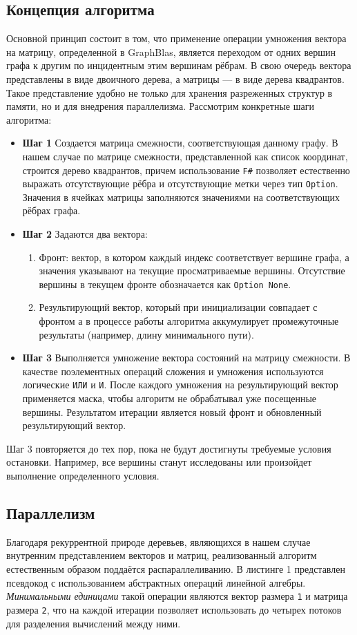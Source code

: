 \subsection{Концепция алгоритма}
Основной принцип состоит в том, что применение операции умножения вектора на матрицу, определенной в GraphBlas, является переходом от одних вершин графа к другим по инцидентным этим вершинам рёбрам.
В свою очередь вектора представлены в виде двоичного дерева, а матрицы --- в виде дерева квадрантов. Такое представление удобно не только для хранения разреженных структур в памяти, но и для внедрения параллелизма. Рассмотрим конкретные шаги алгоритма:
\begin{itemize}
    \item \textbf{Шаг 1} Создается матрица смежности, соответствующая данному графу. В нашем случае по матрице смежности, представленной как список координат, строится дерево квадрантов, причем использование \texttt{F\#} позволяет естественно выражать отсутствующие рёбра и отсутствующие метки через тип \texttt{Option}. Значения в ячейках матрицы заполняются значениями на соответствующих рёбрах графа.
    \item \textbf{Шаг 2} Задаются два вектора:
    \begin{enumerate}
        \item Фронт: вектор, в котором каждый индекс соответствует вершине графа, а значения указывают на текущие просматриваемые вершины. Отсутствие вершины в текущем фронте обозначается как \texttt{Option None}.
        \item Результирующий вектор, который при инициализации совпадает с фронтом а в процессе работы алгоритма аккумулирует промежуточные результаты (например, длину минимального пути).
    \end{enumerate}
    \item \textbf{Шаг 3} Выполняется умножение вектора состояний на матрицу смежности. В качестве поэлементных операций сложения и умножения используются логические \texttt{ИЛИ} и \texttt{И}. После каждого умножения на результирующий вектор применяется маска, чтобы алгоритм не обрабатывал уже посещенные вершины. Результатом итерации является новый фронт и обновленный результирующий вектор.
\end{itemize}
Шаг 3 повторяется до тех пор, пока не будут достигнуты требуемые условия остановки. Например, все вершины станут исследованы или произойдет выполнение определенного условия.

\subsection{Параллелизм}
Благодаря рекуррентной природе деревьев, являющихся в нашем случае внутренним представлением векторов и матриц, реализованный алгоритм естественным образом поддаётся распараллеливанию. В листинге 1 представлен псевдокод с использованием абстрактных операций линейной алгебры. \textit{Минимальными единицами} такой операции являются вектор размера \texttt{1} и матрица размера \texttt{2}, что на каждой итерации позволяет использовать до четырех потоков для разделения вычислений между ними.

